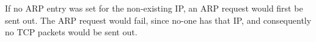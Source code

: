 If no ARP entry was set for the non-existing IP, an ARP request would first be sent out. The ARP request would fail, since no-one has that IP, and consequently no TCP packets would be sent out.
